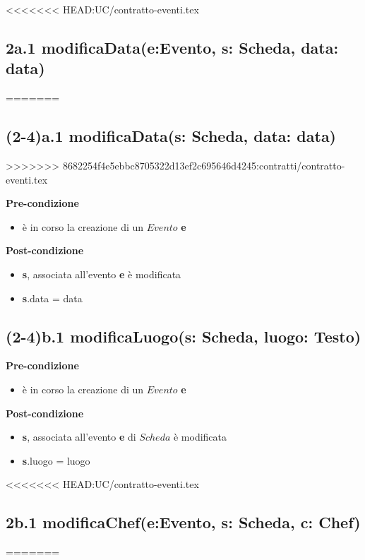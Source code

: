 \documentclass[12pt]{extarticle}
\begin{document}
<<<<<<< HEAD:UC/contratto-eventi.tex
\subsection*{2a.1 modificaData(e:Evento, s: Scheda, data: data)}
=======
\subsection*{(2-4)a.1 modificaData(s: Scheda, data: data)}
>>>>>>> 8682254f4e5ebbc8705322d13ef2c695646d4245:contratti/contratto-eventi.tex

\textbf{Pre-condizione}
\begin{itemize}
  \item è in corso la creazione di un $Evento$ \textbf{e}
\end{itemize} 
\textbf{Post-condizione}
\begin{itemize}
  \item \textbf{s}, associata all'evento \textbf{e} è modificata
  \item \textbf{s}.data = data
\end{itemize} 

\subsection*{(2-4)b.1 modificaLuogo(s: Scheda, luogo: Testo)}

\textbf{Pre-condizione}
\begin{itemize}
  \item è in corso la creazione di un $Evento$ \textbf{e}
\end{itemize} 
\textbf{Post-condizione}
\begin{itemize}
  \item \textbf{s}, associata all'evento \textbf{e} di $Scheda$ è modificata
  \item \textbf{s}.luogo = luogo
\end{itemize} 

<<<<<<< HEAD:UC/contratto-eventi.tex
\subsection*{2b.1 modificaChef(e:Evento, s: Scheda, c: Chef)}
=======
\end{document}
